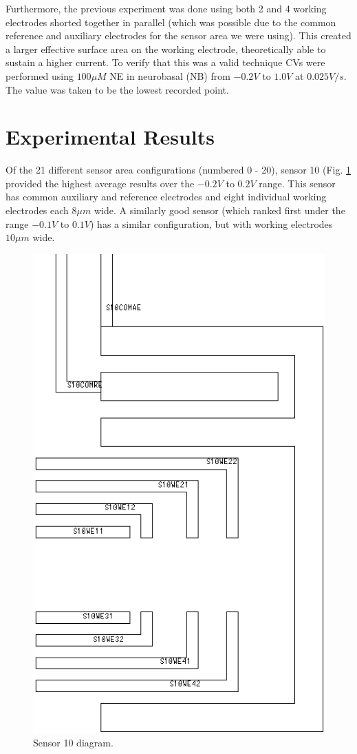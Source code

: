 \documentclass[twocolumn]{article}
\begin{document}
Furthermore, the previous experiment was done using both 2 and 4 working electrodes shorted together in parallel (which was possible due to the common reference and auxiliary electrodes for the sensor area we were using). This created a larger effective surface area on the working electrode, theoretically able to sustain a higher current. To verify that this was a valid technique CVs were performed using $100\mu M$ NE in neurobasal (NB) from $-0.2V$ to $1.0V$ at $0.025V/s$. The value was taken to be the lowest recorded point.

\section{Experimental Results}

Of the 21 different sensor area configurations (numbered 0 - 20), sensor 10 (Fig. \ref{sensor-10} provided the highest average results over the $-0.2V$ to $0.2V$ range. This sensor has common auxiliary and reference electrodes and eight individual working electrodes each $8\mu m$ wide. A similarly good sensor (which ranked first under the range $-0.1V$ to $0.1V$) has a similar configuration, but with working electrodes $10\mu m$ wide.

\begin{figure}
\centering
\includegraphics[height=\linewidth]{figures/s10.png}
\caption{Sensor 10 diagram.}
\label{sensor-10}
\end{figure}
\end{document}
